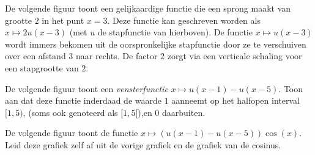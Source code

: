 \documentclass{ximera}
\begin{document}
De volgende figuur toont een gelijkaardige functie
die een sprong maakt van grootte $2$ in het punt $x=3$. Deze functie
kan geschreven worden als $x\mapsto 2u(x-3)$ (met $u$ de stapfunctie
van hierboven). De functie $x\mapsto u(x-3)$ wordt immers bekomen uit
de oorspronkelijke stapfunctie door ze te verschuiven over een afstand
$3$ naar rechts. De factor $2$ zorgt via een verticale schaling voor
een stapgrootte van $2$.

\begin{center}
\end{center}

De volgende figuur toont een {\em vensterfunctie} $x\mapsto
u(x-1)-u(x-5)$. Toon aan dat deze functie inderdaad de waarde $1$
aanneemt op het halfopen interval $[1,5)$, (soms ook genoteerd als
$[1,5[$),en $0$ daarbuiten.

\begin{center}
\end{center}

De volgende figuur toont de functie $x\mapsto
(u(x-1)-u(x-5))\cos(x)$. Leid deze grafiek zelf af uit de vorige
grafiek en de grafiek van de cosinus.
\end{document}
